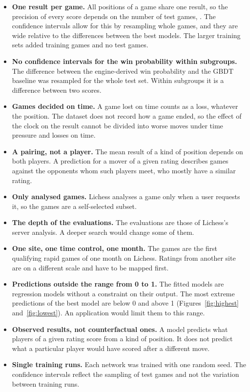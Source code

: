 \documentclass[11pt]{article}
\begin{document}
\begin{itemize}
\item \textbf{One result per game.} All positions of a game share one result,
so the precision of every score depends on the number of test games,
. The confidence intervals allow for this by resampling
whole games, and they are wide relative to the differences between the best
models.\ifmore{} The larger training sets added training games and no test
games.\fi
\item \textbf{No confidence intervals for the win probability within
subgroups.} The difference between the engine-derived win probability and the
GBDT baseline was resampled for the whole test set. Within subgroups it is a
difference between two scores.
\item \textbf{Games decided on time.} A game lost on time counts as a loss,
whatever the position. The dataset does not record how a game ended, so the
effect of the clock on the result cannot be divided into worse moves under
time pressure and losses on time.
\item \textbf{A pairing, not a player.} The mean result of a kind of position
depends on both players. A prediction for a mover of a given rating describes
games against the opponents whom such players meet, who mostly have a similar
rating.
\item \textbf{Only analysed games.} Lichess analyses a game only when a user
requests it, so the games are a self-selected subset.
\item \textbf{The depth of the evaluations.} The evaluations are those of
Lichess's server analysis. A deeper search would change some of them.
\item \textbf{One site, one time control, one month.} The games are the first
qualifying rapid games of one month on Lichess. Ratings from another site are
on a different scale and have to be mapped first.
\item \textbf{Predictions outside the range from 0 to 1.} The fitted models
are regression models without a constraint on their output.\iflook{} The
most extreme predictions of the best model are below 0 and above 1
(Figures~\ref{fig:highest} and~\ref{fig:lowest}).\fi{} An application would
limit them to this range.
\item \textbf{Observed results, not counterfactual ones.} A model predicts
what players of a given rating score from a kind of position. It does not
predict what a particular player would have scored after a different move.
\item \textbf{Single training runs.} Each network was trained with one
random seed. The confidence intervals reflect the sampling of test games and
not the variation between training runs.
\end{itemize}
\end{document}
